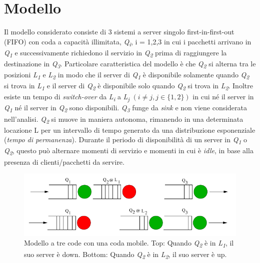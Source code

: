\documentclass[a4paper,11pt]{article}
\begin{document}
\section{Modello}

Il modello considerato consiste di 3 sistemi a server singolo first-in-first-out (FIFO) con coda a capacità illimitata, \textit{Q\textsubscript{i}}, i = 1,2,3 in cui i pacchetti arrivano in \textit{Q\textsubscript{1}} e successivamente richiedono il servizio in \textit{Q\textsubscript{2}} prima di raggiungere la destinazione in \textit{Q\textsubscript{3}}. 
Particolare caratteristica del modello è che \textit{Q\textsubscript{2}} si alterna tra le posizioni \textit{L\textsubscript{1}} e \textit{L\textsubscript{2}} in modo che il server di \textit{Q\textsubscript{1}} è disponibile solamente quando \textit{Q\textsubscript{2}} si trova in \textit{L\textsubscript{1}} e il server di \textit{Q\textsubscript{2}} è disponibile solo quando \textit{Q\textsubscript{2}} si trova in \textit{L\textsubscript{2}}. \newline
Inoltre esiste un tempo di \textit{switch-over} da \textit{L\textsubscript{i}} a \textit{L\textsubscript{j}} $(\textit{i} \neq \textit{j},  \textit{j} \in \{1,2\})$
in cui né il server in \textit{Q\textsubscript{1}} né il server in \textit{Q\textsubscript{2}} sono disponibili.\newline
\textit{Q\textsubscript{3}} funge da \textit{sink} e non viene considerata nell'analisi. \newline
\textit{Q\textsubscript{2}} si muove in maniera autonoma, rimanendo in una determinata locazione L per un intervallo di tempo generato da una distribuzione esponenziale (\textit{tempo di permanenza}).\newline
Durante il periodo di disponibilità di un server in \textit{Q\textsubscript{1}} o \textit{Q\textsubscript{2}}, questo può alternare momenti di servizio e momenti in cui è \textit{idle}, in base alla presenza di clienti/pacchetti da servire.

\begin{figure}[h!]
    \centering
    \includegraphics[width=\linewidth]{images/oppnet-model.png}
    \caption{Modello a tre code con una coda mobile.
    Top: Quando \textit{Q\textsubscript{2}} è in \textit{L\textsubscript{1}}, il suo server è down.
    Bottom: Quando \textit{Q\textsubscript{2}} è in \textit{L\textsubscript{2}}, il suo server è up.}
    \label{fig:1}
\end{figure}
\newpage
\end{document}
